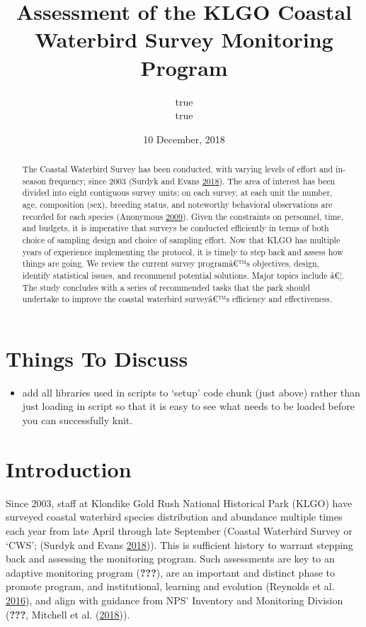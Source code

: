 \documentclass[]{article}
\title{Assessment of the KLGO Coastal Waterbird Survey Monitoring Program}
\author{true \\ true}
\date{10 December, 2018}
\newcommand{\euro}{€}
\providecommand{\tightlist}{%
  \setlength{\itemsep}{0pt}\setlength{\parskip}{0pt}}
\begin{document}
\maketitle
\begin{abstract}
The Coastal Waterbird Survey has been conducted, with varying levels of
effort and in-season frequency, since 2003 (Surdyk and Evans
\protect\hyperlink{ref-Surdyk2018}{2018}). The area of interest has been
divided into eight contiguous survey units; on each survey, at each unit
the number, age, composition (sex), breeding status, and noteworthy
behavioral observations are recorded for each species (Anonymous
\protect\hyperlink{ref-Anonymous2009}{2009}). Given the constraints on
personnel, time, and budgets, it is imperative that surveys be conducted
efficiently in terms of both choice of sampling design and choice of
sampling effort. Now that KLGO has multiple years of experience
implementing the protocol, it is timely to step back and assess how
things are going. We review the current survey programâ\euro{}™s
objectives, design, identify statistical issues, and recommend potential
solutions. Major topics include â\euro{}¦. The study concludes with a
series of recommended tasks that the park should undertake to improve
the coastal waterbird surveyâ\euro{}™s efficiency and effectiveness.
\end{abstract}

{
\setcounter{tocdepth}{2}
\tableofcontents
}
\section{Things To Discuss}\label{things-to-discuss}

\begin{itemize}
\tightlist
\item
  add all libraries used in scripts to `setup' code chunk (just above)
  rather than just loading in script so that it is easy to see what
  needs to be loaded before you can successfully knit.
\end{itemize}

\section{Introduction}\label{introduction}

Since 2003, staff at Klondike Gold Rush National Historical Park (KLGO)
have surveyed coastal waterbird species distribution and abundance
multiple times each year from late April through late September (Coastal
Waterbird Survey or `CWS'; (Surdyk and Evans
\protect\hyperlink{ref-Surdyk2018}{2018})). This is sufficient history
to warrant stepping back and assessing the monitoring program. Such
assessments are key to an adaptive monitoring program ({\textbf{???}}),
are an important and distinct phase to promote program, and
institutional, learning and evolution (Reynolds et al.
\protect\hyperlink{ref-Reynolds2016}{2016}), and align with guidance
from NPS' Inventory and Monitoring Division ({\textbf{???}}, Mitchell et
al. (\protect\hyperlink{ref-Mitchell2018}{2018})).
\end{document}
